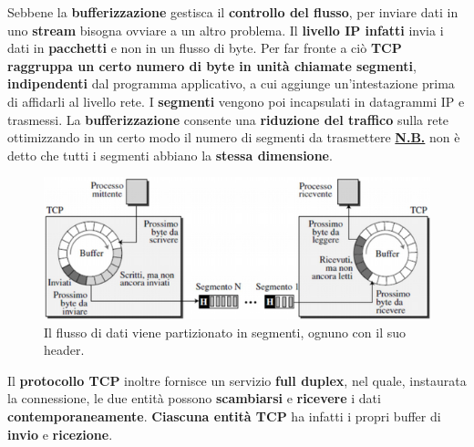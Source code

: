 \documentclass[11pt,a4paper,oneside]{book}
\theoremstyle{definition}
\begin{document}
\pagebreak

Sebbene la \textbf{bufferizzazione} gestisca il \textbf{controllo del flusso}, per inviare dati in uno \textbf{stream} bisogna ovviare a un altro problema. Il \textbf{livello IP infatti} invia i dati in \textbf{pacchetti} e non in un flusso di byte. Per far fronte a ciò \textbf{TCP raggruppa un certo numero di byte in unità chiamate segmenti},  \textbf{indipendenti} dal programma applicativo, a cui aggiunge un'intestazione prima di affidarli al livello rete.
I \textbf{segmenti} vengono poi incapsulati in datagrammi IP e trasmessi. La \textbf{bufferizzazione} consente una \textbf{riduzione del traffico} sulla rete
ottimizzando in un certo modo il numero di segmenti da trasmettere\newline
\textbf{\underline{N.B.}} non è detto che tutti i segmenti abbiano la \textbf{stessa dimensione}.
\begin{figure}[!h]
	\includegraphics[scale=0.5]{Immagini/TCP_segm.png}
	\centering
	\caption{Il flusso di dati viene partizionato in segmenti, ognuno con il suo header.}
\end{figure}\newline
Il \textbf{protocollo TCP} inoltre fornisce un servizio \textbf{full duplex}, nel quale, instaurata la connessione, le due entità possono \textbf{scambiarsi} e \textbf{ricevere} i dati \textbf{contemporaneamente}. \textbf{Ciascuna entità TCP} ha infatti i propri buffer di \textbf{invio} e \textbf{ricezione}.
\end{document}
